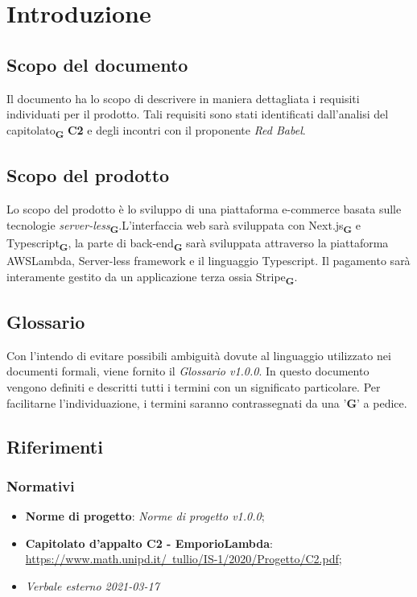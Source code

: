 \section{Introduzione}
    \subsection{Scopo del documento}
    Il documento ha lo scopo di descrivere in maniera dettagliata i requisiti individuati per il prodotto. Tali requisiti sono stati identificati dall'analisi del capitolato\textsubscript{\textbf{G}} \textbf{C2} e degli incontri con il proponente \textit{Red Babel}.
    \subsection{Scopo del prodotto}
    Lo scopo del prodotto è lo sviluppo di una piattaforma e-commerce basata sulle tecnologie \textit{server-less}\textsubscript{\textbf{G}}.L'interfaccia web sarà sviluppata con Next.js\textsubscript{\textbf{G}} e Typescript\textsubscript{\textbf{G}}, la parte di back-end\textsubscript{\textbf{G}} sarà sviluppata attraverso la piattaforma AWSLambda, Server-less framework e il linguaggio Typescript. Il pagamento sarà interamente gestito da un applicazione terza ossia Stripe\textsubscript{\textbf{G}}.
    \subsection{Glossario}
    Con l'intendo di evitare possibili ambiguità dovute al linguaggio utilizzato nei documenti formali, viene fornito il \textit{Glossario v1.0.0}. In questo documento vengono definiti e descritti tutti i termini con un significato particolare. Per facilitarne l'individuazione, i termini saranno contrassegnati da una '\textbf{G}' a pedice.
    \subsection{Riferimenti}
    \subsubsection{Normativi}
    \begin{itemize}
        \item \textbf{Norme di progetto}: \textit{Norme di progetto v1.0.0};
        \item \textbf{Capitolato d'appalto C2 - EmporioLambda}:\\ \href{https://www.math.unipd.it/~tullio/IS-1/2020/Progetto/C2.pdf}{https://www.math.unipd.it/~tullio/IS-1/2020/Progetto/C2.pdf};
        \item \textit{Verbale esterno 2021-03-17}
    \end{itemize}
